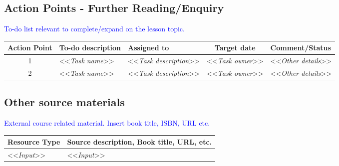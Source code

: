{%
\subsection{Action Points - Further Reading/Enquiry}

{\textcolor{blue}{To-do list relevant to complete/expand on the lesson topic.}}

\begin{adjustbox}{max width=\textwidth}
    \begin{tabular}{c|l|l|c|l}
        {\bfseries{Action Point}} & {\bfseries{To-do description}} & {\bfseries{Assigned to}} & {\bfseries{Target date}} & {\bfseries{Comment/Status}} \\
        \hline
        1 & <<{\emph{Task name}}>> & <<{\emph{Task description}}>> & <<{\emph{Task owner}}>> & <<{\emph{Other details}}>> \\ \hline
        2 & <<{\emph{Task name}}>> & <<{\emph{Task description}}>> & <<{\emph{Task owner}}>> & <<{\emph{Other details}}>> \\ \hline
    \end{tabular}
\end{adjustbox}




\subsection{Other source materials} 

{\textcolor{blue}{External course related material. Insert book title, ISBN, URL etc. }}

\begin{tabular}{p{40mm} | p{120mm}}
    {\bfseries{Resource Type}} & {\bfseries{Source description, Book title, URL, etc.}}\\
    \hline
    <<{\emph{Input}}>> & <<{\emph{Input}}>>\\ \hline
\end{tabular}


}
